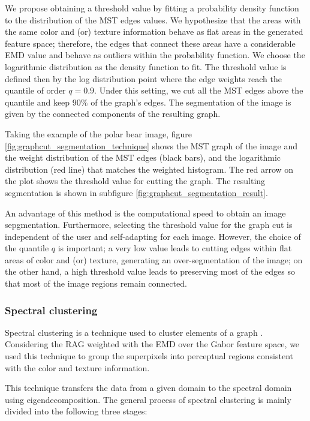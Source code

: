 \documentclass[journal]{IEEEtran}
\begin{document}
We propose obtaining a threshold value by fitting a probability density function to the distribution of the MST edges values. We hypothesize that the areas with the same color and (or) texture information behave as flat areas in the generated feature space; therefore, the edges that connect these areas have a considerable EMD value and behave as outliers within the probability function. We choose the logarithmic distribution as the density function to fit. The threshold value is defined then by the log distribution point where the edge weights reach the quantile of order $q = 0.9$. Under this setting, we cut all the MST edges above the quantile and keep $90\%$ of the graph's edges. The segmentation of the image is given by the connected components of the resulting graph.

Taking the example of the polar bear image, figure \ref{fig:graphcut_segmentation_technique}  shows the MST graph of the image and the weight distribution of the MST edges (black bars), and the logarithmic distribution (red line) that matches the weighted histogram. The red arrow on the plot shows the threshold value for cutting the graph. The resulting segmentation is shown in subfigure \ref{fig:graphcut_segmentation_result}.

An advantage of this method is the computational speed to obtain an image sepgmentation. Furthermore, selecting the threshold value for the graph cut is independent of the user and self-adapting for each image. However, the choice of the quantile $q$ is important; a very low value leads to cutting edges within flat areas of color and (or) texture, generating an over-segmentation of the image; on the other hand, a high threshold value leads to preserving most of the edges so that most of the image regions remain connected.

\subsubsection{Spectral clustering}

Spectral clustering is a technique used to cluster elements of a graph \cite{Ng.Jordan.ea:NIPS:2001}. Considering the RAG weighted with the EMD over the Gabor feature space, we used this technique to group the superpixels into perceptual regions consistent with the color and texture information.

This technique transfers the data from a given domain to the spectral domain using eigendecomposition. The general process of spectral clustering is mainly divided into the following three stages:
\end{document}
